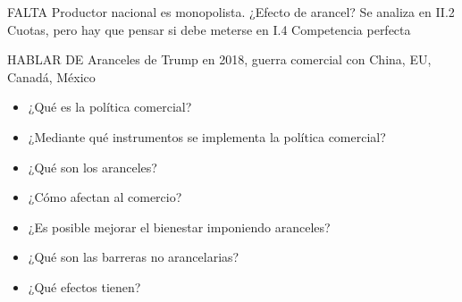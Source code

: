 \documentclass{nuevotema}
\begin{document}
\ideaclave

FALTA Productor nacional es monopolista. ¿Efecto de arancel? Se analiza en II.2 Cuotas, pero hay que pensar si debe meterse en I.4 Competencia perfecta

HABLAR DE Aranceles de Trump en 2018, guerra comercial con China, EU, Canadá, México


\begin{itemize}
	\item ¿Qué es la política comercial?
	\item ¿Mediante qué instrumentos se implementa la política comercial?
	\item ¿Qué son los aranceles?
	\item ¿Cómo afectan al comercio?
	\item ¿Es posible mejorar el bienestar imponiendo aranceles?
	\item ¿Qué son las barreras no arancelarias?
	\item ¿Qué efectos tienen?
\end{itemize}

\esquemacorto
\end{document}
